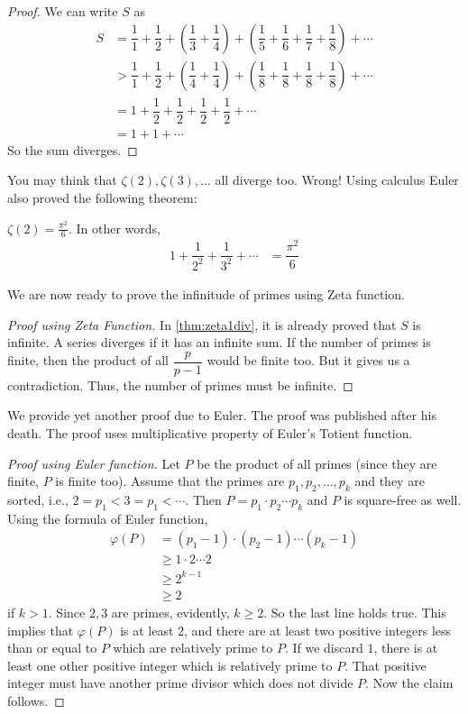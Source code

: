 \documentclass{subfiles}
\begin{document}
		\begin{proof}
			We can write $S$ as
				\begin{align*}
					S & =\dfrac11+ \dfrac12+ \left(\dfrac13+\dfrac14\right)+ \left(\dfrac15+\dfrac16+\dfrac17+\dfrac18\right)+\cdots\\
					  & > \dfrac11+\dfrac12+ \left(\dfrac14+\dfrac14\right) + \left(\dfrac18+\dfrac18+\dfrac18+\dfrac18\right)+\cdots\\
					  & =1+ \dfrac{1}{2}+ \dfrac{1}{2}+ \dfrac{1}{2}+ \dfrac{1}{2}+\cdots\\
					  & = 1+1+\cdots
				\end{align*}
			So the sum diverges.
		\end{proof}
	You may think that $\zeta(2),\zeta(3),\ldots$ all diverge too. Wrong! Using calculus Euler also proved the following theorem:
		\begin{theorem}[Euler]\label{thm:zeta2}
			$\zeta(2)=\frac{\pi^2}{6}$. In other words,
				\begin{align*}
					1+\dfrac{1}{2^2}+\dfrac{1}{3^2}+\cdots & = \dfrac{\pi^2}{6}
				\end{align*}
		\end{theorem}
	We are now ready to prove the infinitude of primes using Zeta function.
		\begin{proof}[Proof using Zeta Function]
			In \autoref{thm:zeta1div}, it is already proved that $S$ is infinite. A series diverges if it has an infinite sum. If the number of primes is finite, then the product of all $\dfrac p{p-1}$ would be finite too. But it gives us a contradiction. Thus, the number of primes must be infinite.
		\end{proof}
	We provide yet another proof due to Euler. The proof was published after his death. The proof uses multiplicative property of Euler's Totient function.
		\begin{proof}[Proof using Euler function]
			Let $P$ be the product of all primes (since they are finite, $P$ is finite too). Assume that the primes are $p_1,p_2,\ldots, p_k$ and they are sorted, i.e., $2=p_1<3=p_1<\cdots$. Then $P = p_1\cdot p_2\cdots p_k$ and $P$ is square-free as well. Using the formula of Euler function,
				\begin{align*}
					\varphi(P)  & = (p_1-1)\cdot(p_2-1)\cdots(p_k-1)\\
							& \geq 1\cdot2\cdots2\\
							& \geq 2^{k-1}\\
							& \geq 2
				\end{align*}
			if $k>1$. Since $2,3$ are primes, evidently, $k\geq2$. So the last line holds true. This implies that $\varphi(P)$ is at least $2$, and there are at least two positive integers less than or equal to $P$ which are relatively prime to $P$. If we discard $1$, there is at least one other positive integer which is relatively prime to $P$. That positive integer must have another prime divisor which does not divide $P$. Now the claim follows.
		\end{proof}
\end{document}
